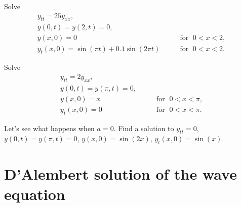 \begin{exercise}
Solve
\begin{equation*}
\begin{array}{ll}
y_{tt} = 25 y_{xx} , &  \\
y(0,t) = y(2,t) = 0 , &  \\
y(x,0) = 0 & \qquad \text{for } \; 0 < x < 2 , \\
y_t(x,0) = \sin(\pi t) + 0.1 \sin(2\pi t) & \qquad \text{for } \; 0 < x < 2 .
\end{array}
\end{equation*}
\end{exercise}

\begin{exercise}
Solve
\begin{equation*}
\begin{array}{ll}
y_{tt} = 2 y_{xx} , &  \\
y(0,t) = y(\pi,t) = 0 , &  \\
y(x,0) = x & \qquad \text{for } \; 0 < x < \pi , \\
y_t(x,0) = 0 & \qquad \text{for } \; 0 < x < \pi .
\end{array}
\end{equation*}
\end{exercise}
\exsol{%
$
y(x,t)
=
\sum\limits_{n=1}^\infty
\frac{2{(-1)}^{n+1}}{n} \,
\sin(nx) \,
\cos( n \sqrt{2}\,t ) 
$
}

\begin{exercise}
Let's see what happens when $a=0$.  Find a solution to
$y_{tt} = 0$, $y(0,t) = y(\pi,t) = 0$,
$y(x,0) = \sin(2x)$,
$y_t(x,0) = \sin(x)$.
\end{exercise}


\sectionnewpage
\section{D'Alembert solution of the wave equation}


